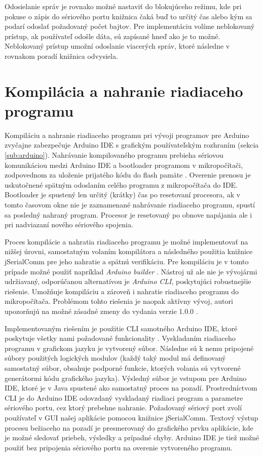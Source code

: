 Odosielanie správ je rovnako možné nastaviť do blokujúceho režimu, kde pri pokuse o zápis do sériového portu knižnica čaká buď to určitý čas alebo kým sa podarí odoslať požadovaný počet bajtov. Pre implementáciu volíme neblokovaný prístup, ak používateľ odošle dáta, sú zapísané hneď ako je to možné. Neblokovaný prístup umožní odoslanie viacerých správ, ktoré následne v rovnakom poradí knižnica odvysiela.


\section{Kompilácia a nahranie riadiaceho programu}
\label{sub:arduinoIDE}
Kompiláciu a nahranie riadiaceho programu pri vývoji programov pre Arduino zvyčajne zabezpečuje Arduino IDE s grafickým používateľským rozhraním (sekcia \ref{sub:arduino}). Nahrávanie kompilovaného programu prebieha sériovou komunikáciou medzi Arduino IDE a bootloader programom v mikropočítači, zodpovednom za uloženie prijatého kódu do flash pamäte \cite{sketchUpload}. Overenie prenosu je uskutočnené spätným odoslaním celého programu z mikropočítača do IDE. Bootloader je spustený len určitý (krátky) čas po resetovaní procesora, ak v tomto časovom okne nie je zaznamenané nahrávanie riadiaceho programu, spustí sa posledný nahraný program. Procesor je resetovaný po obnove napájania ale i pri nadviazaní nového sériového spojenia.

Proces kompilácie a nahratia riadiaceho programu je možné implementovať na nižšej úrovni, samostatným volaním kompilátora a následného použitia knižnice jSerialComm pre jeho nahratie a spätnú verifikáciu. Pre kompiláciu je v tomto prípade možné použiť napríklad \textit{Arduino builder} \cite{arduinoBuilder}. Nástroj už ale nie je vývojármi udržiavaný, odporúčanou alternatívou je \textit{Arduino CLI}, poskytujúci robustnejšie riešenie. Umožňuje kompiláciu a zároveň i nahratie riadiaceho programu do mikropočítača. Problémom tohto riešenia je naopak aktívny vývoj, autori upozorňujú na možné zásadné zmeny do vydania verzie 1.0.0 \cite{arduinoCli}.

Implementovaným riešením je použitie CLI samotného Arduino IDE, ktoré poskytuje všetky nami požadované funkcionality \cite{arduinoIdeCli}. Vyskladaním riadiaceho programu v grafickom jazyku je vytvorený súbor. Následne sú k nemu pripojené súbory použitých logických modulov (každý taký modul má definovaný samostatný súbor, obsahuje podporné funkcie, ktorých volania sú vytvorené generátormi kódu grafického jazyka). Výsledný súbor je vstupom pre Arduino IDE, ktoré je v Java spustené ako samostatný proces na pozadí. Prostredníctvom CLI je do Arduino IDE odovzdaný vyskladaný riadiaci program a parametre sériového portu, cez ktorý prebehne nahranie. Požadovaný sériový port zvolí používateľ v GUI našej aplikácie pomocou knižnice jSerialComm. Textový výstup procesu bežiaceho na pozadí je presmerovaný do grafického prvku aplikácie, kde je možné sledovať priebeh, výsledky a prípadné chyby. Arduino IDE je tiež možné použiť bez pripojenia sériového portu na overenie vytvoreného programu.



